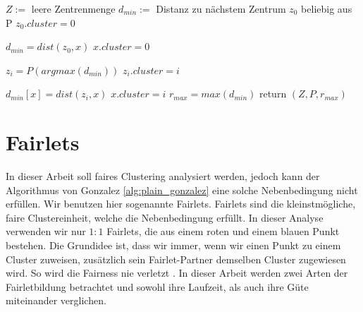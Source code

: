     \begin{algorithm}
        \caption{Gonzalez-Algorithmus}\label{alg:plain_gonzalez}
        \begin{algorithmic}[1]
                \State $Z := $ leere Zentrenmenge
                \State $d_{min} := $ Distanz zu nächstem Zentrum 
                \State $z_0$ beliebig aus P
                \State $z_0.cluster = 0$

                    \State $d_{min} = dist(z_0, x)$
                    \State $x.cluster = 0$
                \EndFor
                \State 

                    \State $z_i = P(argmax(d_{min}))$
                    \State $z_i.cluster = i$

                            \State $d_{min}[x] = dist(z_i, x)$
                            \State $x.cluster = i$
                        \EndIf
                    \EndFor
                \EndFor
                \State $r_{max} = max(d_{min})$
                \State return $(Z, P, r_{max})$ 
            \EndFunction
        \end{algorithmic}
    \end{algorithm}

\section{Fairlets}
    In dieser Arbeit soll faires Clustering analysiert werden, jedoch kann der Algorithmus von Gonzalez \ref{alg:plain_gonzalez} eine solche Nebenbedingung nicht erfüllen. Wir benutzen hier sogenannte Fairlets.
    Fairlets sind die kleinstmögliche, faire Clustereinheit, welche die Nebenbedingung erfüllt. In dieser Analyse verwenden wir nur $1:1$ Fairlets, die aus einem roten und einem blauen Punkt bestehen. Die Grundidee ist, dass wir immer, wenn wir einen Punkt zu einem Cluster zuweisen, zusätzlich sein Fairlet-Partner demselben Cluster zugewiesen wird. So wird die Fairness nie verletzt \cite{BA_Clustering_Irina}. \newline
    In dieser Arbeit werden zwei Arten der Fairletbildung betrachtet und sowohl ihre Laufzeit, als auch ihre Güte miteinander verglichen.











